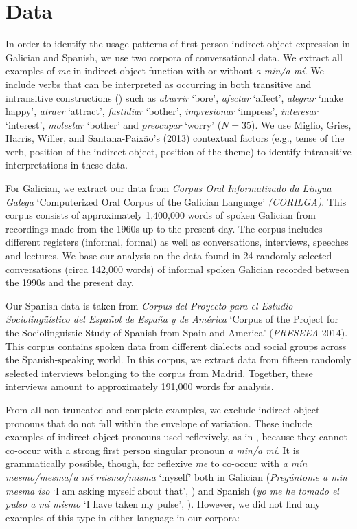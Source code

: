 \documentclass[output=paper]{langscibook}
\begin{document}
\section{Data}

In order to identify the usage patterns of first person indirect object expression in Galician and Spanish, we use two corpora of conversational data. We extract all examples of \textit{me} in indirect object function with or without \textit{a min/a mí.} We include verbs that can be interpreted as occurring in both transitive and intransitive constructions (\citealt{VázquezRozas2006}) such as \textit{aburrir} ‘bore’, \textit{afectar} ‘affect’, \textit{alegrar} ‘make happy’, \textit{atraer} ‘attract’, \textit{fastidiar} ‘bother’, \textit{impresionar} ‘impress’, \textit{interesar} ‘interest’, \textit{molestar} ‘bother’ and \textit{preocupar} ‘worry’ ($N=35$). We use Miglio, Gries, Harris, Willer, and Santana-Paixão’s (2013) contextual factors (e.g., tense of the verb, position of the indirect object, position of the theme) to identify intransitive interpretations in these data. 

For Galician, we extract our data from \textit{Corpus Oral Informatizado da Lingua Galega} ‘Computerized Oral Corpus of the Galician Language’ \textit{(CORILGA)}. This corpus \parencite{FernándezReiFernández2019} consists of approximately 1,400,000 words of spoken Galician from recordings made from the 1960s up to the present day. The corpus includes different registers (informal, formal) as well as conversations, interviews, speeches and lectures. We base our analysis on the data found in 24 randomly selected conversations (circa 142,000 words) of informal spoken Galician recorded between the 1990s and the present day. 

Our Spanish data is taken from \textit{Corpus del Proyecto para el Estudio Sociolingüístico del Español de España y de América} ‘Corpus of the Project for the Sociolinguistic Study of Spanish from Spain and America’ (\textit{PRESEEA} 2014). This corpus contains spoken data from different dialects and social groups across the Spanish-speaking world. In this corpus, we extract data from fifteen randomly selected interviews belonging to the corpus from Madrid. Together, these interviews amount to approximately 191,000 words for analysis.

From all non-truncated and complete examples, we exclude indirect object pronouns that do not fall within the envelope of variation. These include examples of indirect object pronouns used reflexively, as in , because they cannot co-occur with a strong first person singular pronoun \textit{a min\slash a mí}. It is grammatically possible, though, for reflexive \textit{me} to co-occur with \textit{a mín mesmo/mesma}\slash \textit{a mí mismo/misma} ‘myself’ both in Galician (\textit{Pregúntome a min mesma iso} ‘I am asking myself about that’, \citealt[84]{Álvarez2000}) and Spanish (\textit{yo me he tomado el pulso a mí mismo} ‘I have taken my pulse’, \citealt[1458]{Otero1999}). However, we did not find any examples of this type in either language in our corpora: 
\end{document}
